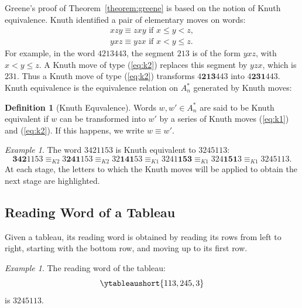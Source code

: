 \documentclass[10pt]{amsproc}
\theoremstyle{definition}
\newtheorem{definition}[theorem]{Definition}
\theoremstyle{remark}
\newtheorem{example}[theorem]{Example}
\begin{document}
Greene's proof of Theorem~\ref{theorem:greene} is based on the notion of Knuth equivalence.
Knuth \cite{knuth} identified a pair of elementary moves on words:
\begin{gather}
  \tag{$K1$}\label{eq:k1}
  xzy \equiv zxy \text{ if } x\leq y < z,
  \\
  \tag{$K2$}\label{eq:k2}
  yxz \equiv yzx \text{ if } x < y \leq z.
\end{gather}
For example, in the word $4213443$, the segment $213$ is of the form $yxz$, with $x<y\leq z$.
A Knuth move of type (\ref{eq:k2}) replaces this segment by $yzx$, which is $231$.
Thus a Knuth move of type (\ref{eq:k2}) transforms $4\textbf{213}443$ into $4\textbf{231}443$.
Knuth equivalence is the equivalence relation on $A_n^*$ generated by Knuth moves:
\begin{definition}[Knuth Equvalence]
  \label{definition:Knuth-equiv}
  Words $w,w'\in A_n^*$ are said to be Knuth equivalent if $w$ can be transformed into $w'$ by a series of Knuth moves (\ref{eq:k1}) and (\ref{eq:k2}).
  If this happens, we write $w\equiv w'$.
\end{definition}
\begin{example}
  \label{example:knuth-red}
  The word $3421153$ is Knuth equivalent to $3245113$:
  \begin{displaymath}
    \textbf{342}1153 \equiv_{K2} 3\textbf{241}153 \equiv_{K2} 32\textbf{141}53 \equiv_{K1} 3241\textbf{153} \equiv_{K1} 324\textbf{151}3 \equiv_{K1} 3245113.
  \end{displaymath}
  At each stage, the letters to which the Knuth moves will be applied to obtain the next stage are highlighted.
\end{example}
\subsection{Reading Word of a Tableau}
\label{sec:reading-word}
Given a tableau, its reading word is obtained by reading its rows from left to right, starting with the bottom row, and moving up to its first row.
\begin{example}
  \label{example:reading-word}
  The reading word of the tableau:
  \begin{displaymath}
    \ytableaushort{113,245,3}
  \end{displaymath}
  is $3245113$.
\end{example}
\end{document}
